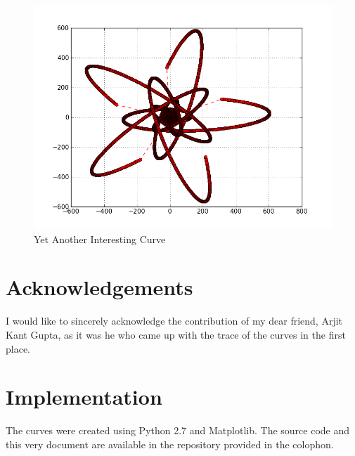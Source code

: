 	\begin{figure}[bth]
		\begin{center}
			\includegraphics[width=0.9\linewidth]{img/spiral_lessdense2_clone}
		\end{center}
	\caption[Yet Another Interesting Curve]{Yet Another Interesting Curve}
	\label{aic3}
	\end{figure}

\section{Acknowledgements}
	I would like to sincerely acknowledge the contribution of my dear friend, Arjit Kant Gupta, as it was he who came up with the trace of the curves in the first place.

\section{Implementation}
	The curves were created using Python 2.7 and Matplotlib. The source code and this very document are available in the repository provided in the colophon.